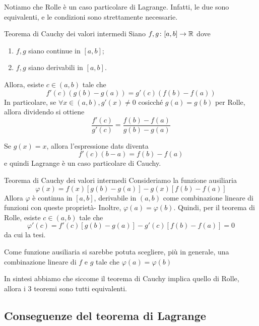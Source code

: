 \documentclass[a4paper]{article}
\begin{document}
Notiamo che Rolle è un caso particolare di Lagrange. Infatti, le due sono equivalenti,
e le condizioni sono strettamente necessarie.

\begin{snippettheorem}{Teorema di Cauchy dei valori intermedi}
    Siano \(f,g\colon [a,b] \to \mathbb{R}\) dove
    \begin{enumerate}
        \item \(f,g\) siano continue in \([a,b]\);
        \item \(f,g\) siano derivabili in \([a,b]\).
    \end{enumerate}
    Allora, esiste \(c \in (a,b)\) tale che
    \[
        f'(c) (g(b)-g(a)) = g'(c) (f(b) - f(a))
    \]
    In particolare, se \(\forall x \in (a,b), g'(x) \neq 0\) cosicché \(g(a) = g(b)\)
    per Rolle, allora dividendo si ottiene
    \[
        \frac{f'(c)}{g'(c)} = \frac{f(b) - f(a)}{g(b) - g(a)}
    \]
\end{snippettheorem}

Se \(g(x) = x\), allora l'espressione dats diventa
\[
    f'(c)(b-a) = f(b) - f(a)
\]
e quindi Lagrange è un caso particolare di Cauchy.

\begin{snippetproof}{Teorema di Cauchy dei valori intermedi}
    Consideriamo la funzione ausiliaria
    \[
        \varphi(x) = f(x) [g(b) - g(a)] - g(x)[f(b)-f(a)]
    \]
    Allora \(\varphi\) è continua in \([a,b]\), derivabile
    in \((a,b)\) come combinazione lineare di funzioni con queste proprietà-
    Inoltre,
    \(\varphi(a) = \varphi(b)\). Quindi, per il teorema di Rolle,
    esiste \(c \in (a,b)\) tale che
    \[
        \varphi'(c) = f'(c)[g(b) - g(a)] - g'(c)[f(b) - f(a)] = 0
    \]
    da cui la tesi.
\end{snippetproof}

Come funzione ausiliaria si sarebbe potuta scegliere, più in generale,
una combinazione lineare di \(f\) e \(g\) tale che \(\varphi(a) = \varphi(b)\)

In sintesi abbiamo che siccome il teorema di Cauchy implica quello di Rolle,
allora i 3 teoremi sono tutti equivalenti.

\subsection{Conseguenze del teorema di Lagrange}
\end{document}
